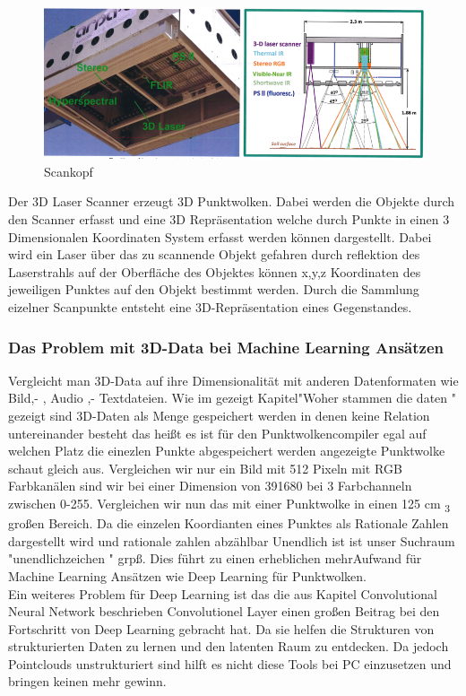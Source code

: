 \documentclass{llncs}
\begin{document}
\begin{figure}[htbp] 
	\centering
	\includegraphics[width=1.0\textwidth]{lematech_2.png}
	\caption{Scankopf}
	\label{fig:Bild14}
\end{figure}

Der 3D Laser Scanner erzeugt 3D Punktwolken. Dabei werden die Objekte durch den Scanner erfasst und eine 3D Repräsentation welche durch Punkte in einen 3 Dimensionalen Koordinaten System erfasst werden können dargestellt. Dabei wird ein Laser über das zu scannende Objekt gefahren durch reflektion des Laserstrahls auf der Oberfläche des Objektes können x,y,z Koordinaten des jeweiligen Punktes auf den Objekt bestimmt werden. Durch die Sammlung eizelner Scanpunkte entsteht eine 3D-Repräsentation eines Gegenstandes. 
\subsubsection{Das Problem mit 3D-Data bei Machine Learning Ansätzen}

Vergleicht man 3D-Data auf ihre Dimensionalität mit anderen Datenformaten wie Bild,- , Audio ,- Textdateien. Wie im gezeigt Kapitel"Woher stammen die daten " gezeigt sind 3D-Daten als Menge gespeichert werden in denen keine Relation untereinander besteht das heißt es ist für den Punktwolkencompiler egal auf welchen Platz die einezlen Punkte abgespeichert werden angezeigte Punktwolke schaut gleich aus. Vergleichen wir nur ein Bild mit 512 Pixeln mit RGB Farbkanälen sind wir bei einer Dimension von 391680 bei 3 Farbchanneln zwischen 0-255. Vergleichen wir nun das mit einer Punktwolke in einen 125 cm \textsubscript{3} großen Bereich. Da die einzelen Koordianten eines Punktes als Rationale Zahlen dargestellt wird und rationale zahlen abzählbar Unendlich ist ist unser Suchraum "unendlichzeichen " grpß. Dies führt zu einen erheblichen mehrAufwand für Machine Learning Ansätzen wie Deep Learning für Punktwolken.\\

Ein weiteres Problem für Deep Learning ist das die aus Kapitel Convolutional Neural Network beschrieben Convolutionel Layer einen großen Beitrag bei den Fortschritt von Deep Learning gebracht hat. Da sie helfen die Strukturen von strukturierten Daten zu lernen und den latenten Raum zu entdecken. Da jedoch Pointclouds unstrukturiert sind hilft es nicht diese Tools bei PC einzusetzen und bringen keinen mehr gewinn. 
\end{document}
